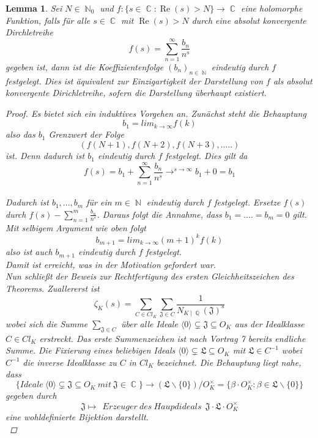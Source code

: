 \documentclass[10pt,a4paper]{article}
\theoremstyle{plain}
\newtheorem{lem}[thm]{Lemma}
\theoremstyle{definition}
\theoremstyle{remark}
\DeclareMathOperator{\C}{\mathbb{C}}
\DeclareMathOperator{\Q}{\mathbb{Q}}
\DeclareMathOperator{\N}{\mathbb{N}}
\DeclareMathOperator{\re}{Re}
\begin{document}
 \begin{lem}
 
Sei $N \in \N_0$ und $f \colon \{s \in \C \colon \re(s)>N\}\rightarrow \C$ eine holomorphe Funktion, falls für alle $s \in \C$ mit $ \re(s) >N$ durch eine absolut konvergente Dirchletreihe $$f(s) = \sum_{n=1}^{\infty}\frac{b_n}{n^s}$$gegeben ist, dann ist die Koeffizientenfolge $(b_n)_{n \in \N}$ eindeutig durch $f$ festgelegt. Dies ist äquivalent zur Einzigartigkeit der Darstellung von $f$ als absolut konvergente Dirichletreihe, sofern die Darstellung überhaupt existiert.
 \\
\begin{proof}
 Es bietet sich ein induktives Vorgehen an.
Zunächst steht die Behauptung $$b_1= lim_{k \to \infty} f(k)$$also das $b_1$ Grenzwert der Folge $$(f(N+1),f(N+2),f(N+3),.....)$$ ist. Denn dadurch ist $b_1$ eindeutig durch $f$ festgelegt. Dies gilt da $$f(s)=b_1+\sum_{n=1}^{\infty} \frac{b_n}{n^s}\rightarrow^{s \to \infty} b_1 + 0 = b_1$$
\\ 
Dadurch ist $b_1,...,b_m$ für ein $m \in \N$ eindeutig durch $f$ festgelegt. Ersetze $f(s)$ durch $f(s)-\sum_{n=1}^{m}\frac{b_n}{n^s}$. Daraus folgt die Annahme, dass $b_1=....=b_m=0$ gilt. Mit selbigem Argument wie oben folgt $$b_{m+1}=lim_{k\to \infty}(m+1)^k f(k)$$ also ist auch $b_{m+1}$ eindeutig durch $f$ festgelegt.
\\
Damit ist erreicht, was in der Motivation gefordert war.
\\
Nun schließt der Beweis zur Rechtfertigung des ersten Gleichheitszeichen des Theorems. Zuallererst ist $$\zeta_K(s) = \sum_{C \in Cl_K}\sum_{\mathfrak{J} \in C}\frac{1}{N_{K\mid \Q}(\mathfrak{J})^s}$$wobei sich die Summe $\sum_{\mathfrak{J} \in C}$ über alle Ideale $\langle 0 \rangle \subsetneq \mathfrak{J} \subseteq O_K$ aus der Idealklasse $C \in Cl_K$ erstreckt. Das erste Summenzeichen ist nach Vortrag 7 bereits endliche Summe. Die Fixierung eines beliebigen Ideals $\langle 0 \rangle \subsetneq \mathfrak{L} \subseteq O_K$ mit $\mathfrak{L}\in C^{-1}$ wobei $C^{-1}$ die inverse Idealklasse zu $C$ in $Cl_K$ bezeichnet. Die Behauptung liegt nahe, dass  $$\{Ideale \ \langle 0 \rangle \subsetneq \mathfrak{J} \subseteq O_K \ mit \ \mathfrak{J} \in \C\}\rightarrow(\mathfrak{L}\backslash\{0\})/O_K^{\times}=\{ \beta \cdot O_K^{\times} \colon \beta \in \mathfrak{L}\backslash\{ 0\}\}$$ gegeben durch $$\mathfrak{J}\mapsto \ \ Erzeuger\ des\ Haupdideals \ \ \mathfrak{J\cdot L}\cdot O_K^{\times}$$ eine wohldefinierte Bijektion darstellt. \\

\end{proof}
\end{lem}
\end{document}
